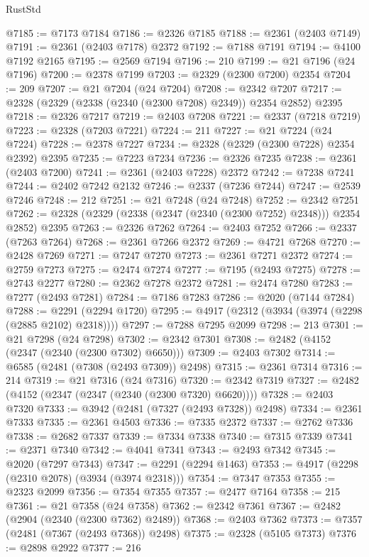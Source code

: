 \begin{lexlean}{RustStd}
\begin{coremodule}
@7185 := @7173 @7184
@7186 := @2326 @7185
@7188 := @2361 (@2403 @7149)
@7191 := @2361 (@2403 @7178) @2372
@7192 := @7188 @7191
@7194 := @4100 @7192 @2165
@7195 := @2569 @7194
@7196 := 210
@7199 := @21 @7196 (@24 @7196)
@7200 := @2378 @7199
@7203 := @2329 (@2300 @7200) @2354
@7204 := 209
@7207 := @21 @7204 (@24 @7204)
@7208 := @2342 @7207
@7217 := @2328 (@2329 (@2338 (@2340 (@2300 @7208) @2349)) @2354 @2852) @2395
@7218 := @2326 @7217
@7219 := @2403 @7208
@7221 := @2337 (@7218 @7219)
@7223 := @2328 (@7203 @7221)
@7224 := 211
@7227 := @21 @7224 (@24 @7224)
@7228 := @2378 @7227
@7234 := @2328 (@2329 (@2300 @7228) @2354 @2392) @2395
@7235 := @7223 @7234
@7236 := @2326 @7235
@7238 := @2361 (@2403 @7200)
@7241 := @2361 (@2403 @7228) @2372
@7242 := @7238 @7241
@7244 := @2402 @7242 @2132
@7246 := @2337 (@7236 @7244)
@7247 := @2539 @7246
@7248 := 212
@7251 := @21 @7248 (@24 @7248)
@7252 := @2342 @7251
@7262 := @2328 (@2329 (@2338 (@2347 (@2340 (@2300 @7252) @2348))) @2354 @2852) @2395
@7263 := @2326 @7262
@7264 := @2403 @7252
@7266 := @2337 (@7263 @7264)
@7268 := @2361 @7266 @2372
@7269 := @4721 @7268
@7270 := @2428 @7269
@7271 := @7247 @7270
@7273 := @2361 @7271 @2372
@7274 := @2759 @7273
@7275 := @2474 @7274
@7277 := @7195 (@2493 @7275)
@7278 := @2743 @2277
@7280 := @2362 @7278 @2372
@7281 := @2474 @7280
@7283 := @7277 (@2493 @7281)
@7284 := @7186 @7283
@7286 := @2020 (@7144 @7284)
@7288 := @2291 (@2294 @1720)
@7295 := @4917 (@2312 (@3934 (@3974 (@2298 (@2885 @2102) @2318))))
@7297 := @7288 @7295 @2099
@7298 := 213
@7301 := @21 @7298 (@24 @7298)
@7302 := @2342 @7301
@7308 := @2482 (@4152 (@2347 (@2340 (@2300 @7302) @6650)))
@7309 := @2403 @7302
@7314 := @6585 (@2481 (@7308 (@2493 @7309)) @2498)
@7315 := @2361 @7314
@7316 := 214
@7319 := @21 @7316 (@24 @7316)
@7320 := @2342 @7319
@7327 := @2482 (@4152 (@2347 (@2347 (@2340 (@2300 @7320) @6620))))
@7328 := @2403 @7320
@7333 := @3942 (@2481 (@7327 (@2493 @7328)) @2498)
@7334 := @2361 @7333
@7335 := @2361 @4503
@7336 := @7335 @2372
@7337 := @2762 @7336
@7338 := @2682 @7337
@7339 := @7334 @7338
@7340 := @7315 @7339
@7341 := @2371 @7340
@7342 := @4041 @7341
@7343 := @2493 @7342
@7345 := @2020 (@7297 @7343)
@7347 := @2291 (@2294 @1463)
@7353 := @4917 (@2298 (@2310 @2078) (@3934 (@3974 @2318)))
@7354 := @7347 @7353
@7355 := @2323 @2099
@7356 := @7354 @7355
@7357 := @2477 @7164
@7358 := 215
@7361 := @21 @7358 (@24 @7358)
@7362 := @2342 @7361
@7367 := @2482 (@2904 (@2340 (@2300 @7362) @2489))
@7368 := @2403 @7362
@7373 := @7357 (@2481 (@7367 (@2493 @7368)) @2498)
@7375 := @2328 (@5105 @7373)
@7376 := @2898 @2922
@7377 := 216

\end{coremodule}
\end{lexlean}
